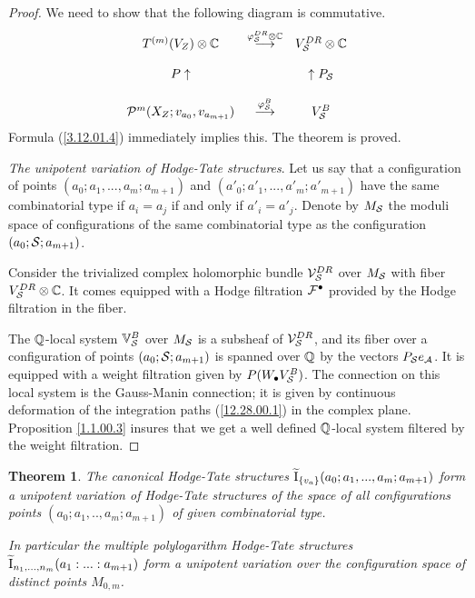 \documentclass[10pt]{article}
\newtheorem{theorem}{Theorem}[section]
\begin{document}
\begin{proof} We need to show that the following diagram is commutative. 
$$
\begin{array}{ccc}
T^{(m)}(V_Z)\otimes {\mathbb C} & \stackrel{\varphi_{{\cal S}}^{DR}\otimes {\mathbb C}}{\longrightarrow}& V_{\cal S}^{DR}\otimes {\mathbb C}\\
&&\\
P \uparrow && \uparrow P_{\cal S}\\
&&\\
{\cal P}^m(X_Z; v_{a_0}, v_{a_{m+1}}) & \stackrel{\varphi_{{\cal S}}^B}{\longrightarrow}& V_{\cal S}^{B}
\end{array}
$$
Formula (\ref{3.12.01.4}) immediately implies this. The theorem 
is proved. 


{\it The unipotent variation of Hodge-Tate structures}. 
Let us say that a configuration of points $(a_0; a_1, ..., a_m; a_{m+1})$ and 
$(a'_0; a'_1, ..., a'_m; a'_{m+1})$ have the same combinatorial type if $a_i = a_j$ if and only if $a'_i = a'_j$. Denote by $M_{\cal S}$ the moduli space of configurations 
 of the same combinatorial type as the configuration 
$(a_0; {\cal S}; a_{m+1})$. 


Consider the trivialized complex holomorphic bundle ${\cal V}^{DR}_{\cal S}$ over 
$M_{\cal S}$ with 
 fiber ${V}^{DR}_{{\cal S}} \otimes {\mathbb C}$. It comes
 equipped with a Hodge filtration ${\cal F}^{\bullet}$ provided by the Hodge 
filtration in
 the fiber.


The ${\mathbb Q}$-local system ${\mathbb V}^B_{{\cal S}}$ over $M_{\cal S}$ 
is a subsheaf of ${\cal V}^{DR}_{{\cal S}}$, and  
its fiber over a configuration of points 
$(a_0; {\cal S}; a_{m+1})$ is spanned over ${\mathbb Q}$ by the vectors  
$P_{\cal S} e_{\cal A}$. It is 
equipped with a weight filtration given by $P(W_{\bullet}V^B_{{\cal S}})$. 
The connection on this local system is the Gauss-Manin connection; it is given   
 by continuous deformation of  the integration paths (\ref{12.28.00.1}) 
in the complex plane. 
Proposition  \ref{1.1.00.3} insures that 
we get  a well defined ${\mathbb Q}$-local system filtered by the weight filtration. 


\end{proof}

\begin{theorem} \label{3.5.01.1} The canonical Hodge-Tate structures 
$\widetilde {\rm I}_{\{v_a\}}(a_0; a_1,  ..., a_m; a_{m+1})$ form  a unipotent 
variation of Hodge-Tate structures of the space of all configurations 
points $(a_0; a_1, .., a_m; a_{m+1})$ of given combinatorial type. 

In particular the multiple polylogarithm Hodge-Tate structures 
$\widetilde {\rm I}_{n_1, ..., n_m}(a_1:  ... : a_{m+1})$ form a unipotent 
variation over the configuration space of distinct points $M_{0,m}$. 
\end{theorem}
\end{document}
